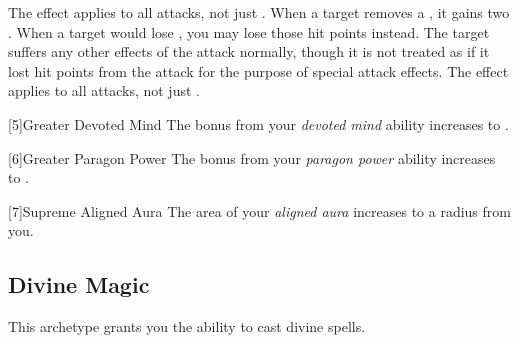          The effect applies to all attacks, not just .
         When a target removes a , it gains two .
         When a target would lose , you may lose those hit points instead.
        The target suffers any other effects of the attack normally, though it is not treated as if it lost hit points from the attack for the purpose of special attack effects.
         The effect applies to all attacks, not just .

        [5]{Greater Devoted Mind} The bonus from your \textit{devoted mind} ability increases to .

        [6]{Greater Paragon Power} The bonus from your \textit{paragon power} ability increases to .

        [7]{Supreme Aligned Aura}
        The area of your \textit{aligned aura} increases to a \areahuge radius  from you.



    \newpage
    \subsection{Divine Magic}
        This archetype grants you the ability to cast divine spells.

